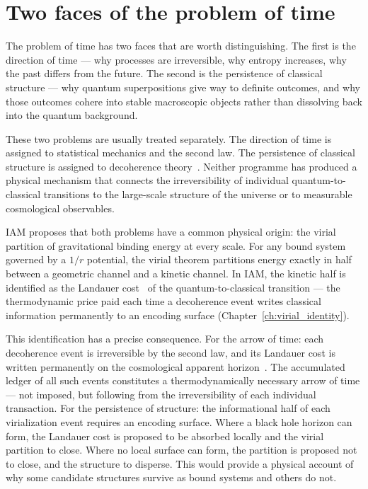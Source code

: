\section{Two faces of the problem of time}\label{sec:vd_intro}
The problem of time has two faces that are worth distinguishing. The first is the direction of time --- why processes are irreversible, why entropy
increases, why the past differs from the future. The second is the persistence of classical structure --- why quantum superpositions give way to definite
outcomes, and why those outcomes cohere into stable macroscopic objects rather than dissolving back into the quantum background.

These two problems are usually treated separately. The direction of time is assigned to statistical mechanics and the second law. The persistence of
classical structure is assigned to decoherence theory~\cite{Zurek2003}. Neither programme has produced a physical mechanism that connects the irreversibility
of individual quantum-to-classical transitions to the large-scale structure of the universe or to measurable cosmological observables.

IAM proposes that both problems have a common physical origin: the virial partition of gravitational binding energy at every scale. For any bound system
governed by a $1/r$ potential, the virial theorem partitions energy exactly in half between a geometric channel and a kinetic channel. In IAM, the kinetic half
is identified as the Landauer cost~\cite{Landauer1961} of the quantum-to-classical transition --- the thermodynamic price paid each time a decoherence event
writes classical information permanently to an encoding surface (Chapter~\ref{ch:virial_identity}).

This identification has a precise consequence. For the arrow of time: each decoherence event is irreversible by the second law, and its Landauer cost is
written permanently on the cosmological apparent horizon~\cite{Jacobson1995,CaiKim2005,GibbonsHawking1977}. The accumulated ledger of all such events
constitutes a thermodynamically necessary arrow of time --- not imposed, but following from the irreversibility of each individual transaction. For the
persistence of structure: the informational half of each virialization event requires an encoding surface. Where a black hole horizon can form, the Landauer
cost is proposed to be absorbed locally and the virial partition to close. Where no local surface can form, the partition is proposed not to close, and the
structure to disperse. This would provide a physical account of why some candidate structures survive as bound systems and others do not. \conjecture

